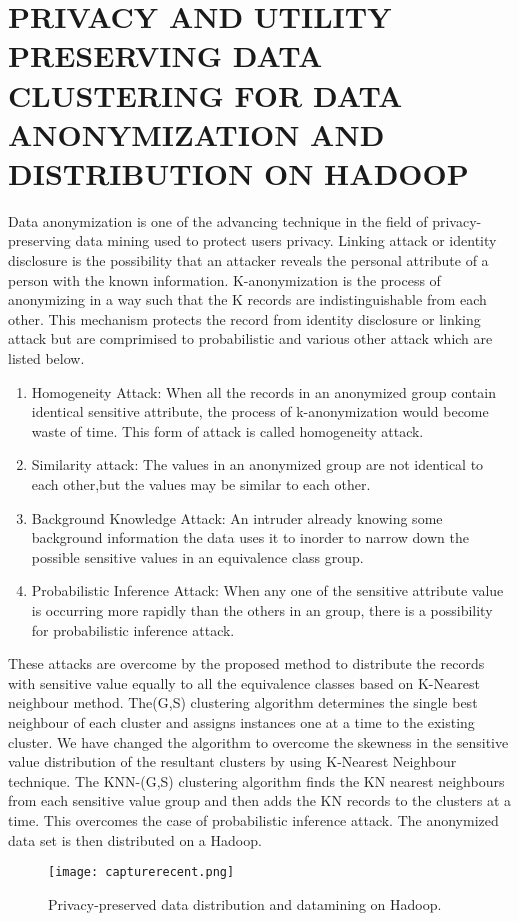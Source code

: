 \documentclass[10pt,a4paper,journal]{IEEEtran}
\begin{document}
\section{PRIVACY AND UTILITY PRESERVING DATA CLUSTERING FOR DATA ANONYMIZATION AND DISTRIBUTION ON HADOOP}
\hspace{2em}  Data anonymization is one of the advancing technique in the field of privacy-preserving data mining used to protect users privacy. Linking attack or identity disclosure is the possibility that an attacker reveals the personal attribute  of a person with the known information. K-anonymization is the process of anonymizing in a way such that the K records are indistinguishable from each other. This mechanism protects the record from identity disclosure or linking attack but are comprimised to probabilistic and various other attack which are listed below.
\begin{enumerate}
\item Homogeneity Attack: When all the records in an anonymized group contain identical sensitive attribute, the process of k-anonymization would become waste of time. This form of attack is called homogeneity attack.
\item Similarity attack: The values in an anonymized group are not identical to each other,but the values may be similar to each other.
\item Background Knowledge Attack: An intruder already knowing some background information the data uses it to inorder to narrow down the possible sensitive values in an equivalence class group.
\item Probabilistic Inference Attack: When any one of the sensitive attribute value is occurring more rapidly than the others in an group, there is a possibility for probabilistic inference attack. 
\end{enumerate}
\hspace{2em} These attacks are overcome by the proposed method to distribute the records with sensitive value equally to all the equivalence classes based on K-Nearest neighbour method. The(G,S) clustering algorithm determines the single best neighbour of each cluster and assigns instances one at a time to the existing cluster. We have changed the algorithm to overcome the skewness in the sensitive value distribution of the resultant clusters by using K-Nearest Neighbour technique. The KNN-(G,S) clustering algorithm\cite{3} finds the KN nearest neighbours from each sensitive value group and then adds the KN records to the clusters at a time. This overcomes the case of probabilistic inference attack. The anonymized data set is then distributed on a Hadoop\cite{10}. 
\begin{figure}[htbp]
\begin{center}
\texttt{[image: capturerecent.png]}
\caption{Privacy-preserved data distribution and datamining on Hadoop\cite{3}.}
\label{Figure 3:}
\end{center}
\end{figure}
\end{document}
